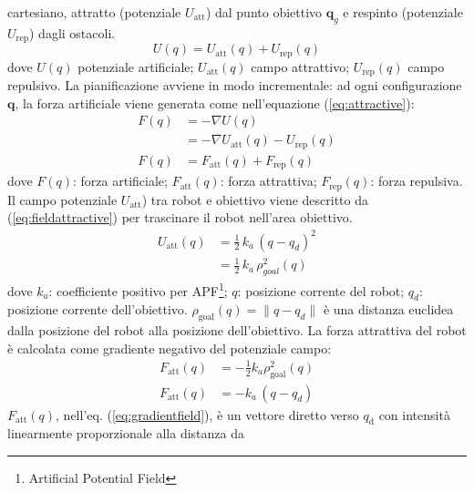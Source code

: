 cartesiano, attratto (potenziale $U_{\text{att}}$) dal punto obiettivo 
$\mathbf{q}_g$ e respinto (potenziale $U_{\text{rep}}$) dagli ostacoli.
\begin{equation}
\label{eq:apfm}
U(q) = U_{\text{att}}(q) + U_{\text{rep}}(q)
\end{equation}
%
\noindent dove $U(q)$ potenziale artificiale; $U_{\text{att}}(q)$ campo 
attrattivo; $U_{\text{rep}}(q)$ campo repulsivo.
La pianificazione avviene in modo incrementale: ad ogni configurazione 
$\mathbf{q}$, la forza artificiale viene generata come nell'equazione (\ref{eq:attractive}):
\begin{equation}
\label{eq:attractive}
\begin{split}
F(q) &= - \nabla U(q)\\
&= - \nabla U_{\text{att}}(q) -U_{\text{rep}}(q)\\
F(q) &= F_{\text{att}}(q) + F_{\text{rep}}(q)	
\end{split}
\end{equation}
dove $F(q)$: forza artificiale; $F_{\text{att}}(q)$: forza attrattiva; 
$F_{\text{rep}}(q)$: forza repulsiva. Il campo potenziale $U_{\text{att}}$) tra 
robot e obiettivo viene descritto da (\ref{eq:fieldattractive}) per trascinare 
il robot nell'area obiettivo.
\begin{equation}
\label{eq:fieldattractive}
\begin{split}
U_{\text{att}}(q) &= \frac{1}{2} \, k_a \, (q-q_d)^2\\
&= \frac{1}{2} \, k_a \, \rho^{2}_{goal}(q)
\end{split}
\end{equation}
dove $k_a$: coefficiente positivo per APF\footnote{Artificial Potential Field};
$q$: posizione corrente del robot; $q_{d}$: posizione corrente dell'obiettivo.
$\rho_{\text{goal}}(q) = \|q-q_{d}\|$ è una distanza euclidea dalla posizione 
del robot alla posizione dell'obiettivo. La forza attrattiva del robot è 
calcolata come gradiente negativo del potenziale campo\cite{6283526}:
\begin{equation}
\label{eq:gradientfield}
\begin{split}
F_{\text{att}}(q) &= -\frac{1}{2}k_a \rho^2_{\text{goal}}(q)\\
F_{\text{att}}(q) &= -k_a \, (q-q_d)
\end{split}
\end{equation}
%
$F_{\text{att}}(q)$, nell'eq. (\ref{eq:gradientfield}), è un vettore diretto 
verso $q_{\text{d}}$ con intensità linearmente proporzionale alla distanza da 
